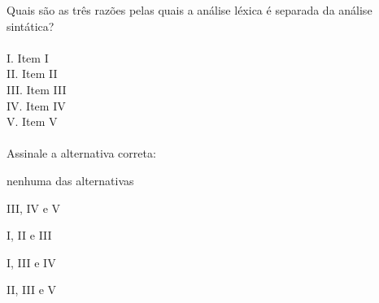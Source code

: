 \question[10]

Quais são as três razões pelas quais a análise léxica é separada da análise sintática?\\
\\
I. Item I\\
II. Item II\\
III. Item III\\
IV. Item IV\\
V. Item V\\
\\
Assinale a alternativa correta:
\begin{choices}
\item nenhuma das alternativas
\item III, IV e V
\item I, II e III
\item I, III e IV
\item II, III e V %
\end{choices}
\answerline

